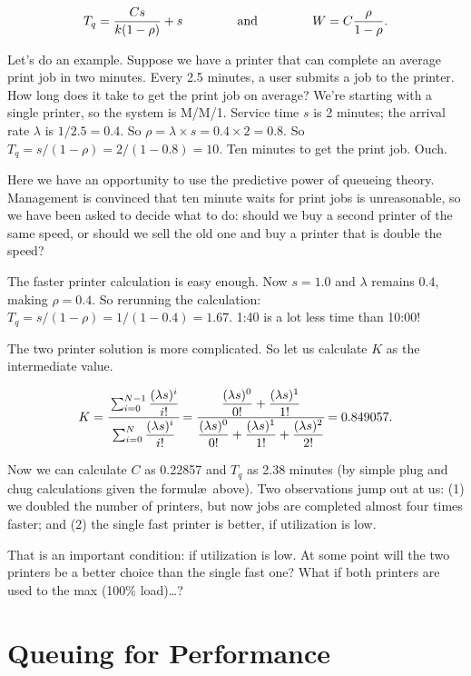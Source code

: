 \[
  T_{q} = \dfrac{C s}{k(1 - \rho)} + s \mbox{ \qquad\qquad and \qquad\qquad } W = C \dfrac{\rho}{1 - \rho}.
\]

Let's do an example. Suppose we have a printer that can complete an average print job in two minutes. Every 2.5 minutes, a user submits a job to the printer. How long does it take to get the print job on average? We're starting with a single printer, so the system is M/M/1. Service time $s$ is 2 minutes; the arrival rate $\lambda$ is $1/2.5 = 0.4$. So $\rho = \lambda \times s = 0.4 \times 2 = 0.8$. So $T_{q} = s / (1 - \rho ) = 2 / (1 -0.8 ) = 10$. Ten minutes to get the print job. Ouch.

Here we have an opportunity to use the predictive power of queueing theory. Management is convinced that ten minute waits for print jobs is unreasonable, so we have been asked to decide what to do: should we buy a second printer of the same speed, or should we sell the old one and buy a printer that is double the speed?

The faster printer calculation is easy enough. Now $s = 1.0$ and $\lambda$ remains $0.4$, making $\rho = 0.4$. So rerunning the calculation: $T_{q} = s / (1 - \rho ) = 1 / (1 - 0.4 ) = 1.67$. 1:40 is a lot less time than 10:00! 

The two printer solution is more complicated. So let us calculate $K$ as the intermediate value. 

\[K = \cfrac{\sum_{i=0}^{N-1}\dfrac{(\lambda s)^{i}}{i!}}{{\sum_{i=0}^{N}\dfrac{(\lambda s)^{i}}{i!}}} = \cfrac{\dfrac{(\lambda s)^{0}}{0!} + \dfrac{(\lambda s)^{1}}{1!}}{\dfrac{(\lambda s)^{0}}{0!} + \dfrac{(\lambda s)^{1}}{1!} + \dfrac{(\lambda s)^{2}}{2!}} = 0.849057.\]

Now we can calculate $C$ as 0.22857 and $T_{q}$ as 2.38 minutes (by simple plug and chug calculations given the formul\ae\  above). Two observations jump out at us: (1) we doubled the number of printers, but now jobs are completed almost four times faster; and (2) the single fast printer is better, if utilization is low.

That is an important condition: if utilization is low. At some point will the two printers be a better choice than the single fast one? What if both printers are used to the max (100\% load)\ldots?

\section*{Queuing for Performance}

